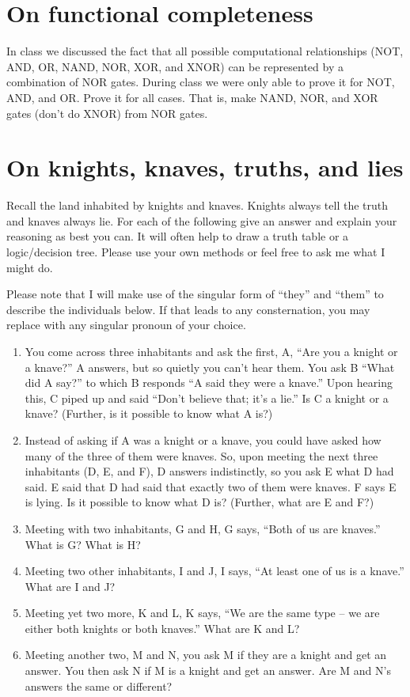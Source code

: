 \documentclass[11pt]{book}
\begin{document}
\section{On functional completeness}
In class we discussed the fact that all possible computational relationships (NOT, AND, OR, NAND, NOR, XOR, and XNOR) can be represented by a combination of NOR gates. During class we were only able to prove it for NOT, AND, and OR. Prove it for all cases. That is, make NAND, NOR, and XOR gates (don’t do XNOR) from NOR gates.

\newpage
\section{On knights, knaves, truths, and lies}
Recall the land inhabited by knights and knaves. Knights always tell the truth and knaves always lie. For each of the following give an answer and explain your reasoning as best you can. It will often help to draw a truth table or a logic/decision tree. Please use your own methods or feel free to ask me what I might do.

Please note that I will make use of the singular form of ``they'' and ``them'' to describe the individuals below. If that leads to any consternation, you may replace with any singular pronoun of your choice.

\begin{enumerate}
	\item You come across three inhabitants and ask the first, A, ``Are you a knight or a knave?'' A answers, but so quietly you can’t hear them. You ask B ``What did A say?” to which B responds “A said they were a knave.'' Upon hearing this, C piped up and said ``Don’t believe that; it’s a lie.'' Is C a knight or a knave? (Further, is it possible to know what A is?)
	\item Instead of asking if A was a knight or a knave, you could have asked how many of the three of them were knaves. So, upon meeting the next three inhabitants (D, E, and F), D answers indistinctly, so you ask E what D had said. E said that D had said that exactly two of them were knaves. F says E is lying. Is it possible to know what D is? (Further, what are E and F?)
	\item Meeting with two inhabitants, G and H, G says, ``Both of us are knaves.'' What is G? What is H?
	\item Meeting two other inhabitants, I and J, I says, ``At least one of us is a knave.'' What are I and J?
	\item Meeting yet two more, K and L, K says, ``We are the same type – we are either both knights or both knaves.'' What are K and L?
	\item Meeting another two, M and N, you ask M if they are a knight and get an answer. You then ask N if M is a knight and get an answer. Are M and N’s answers the same or different? 
\end{enumerate}
\end{document}
